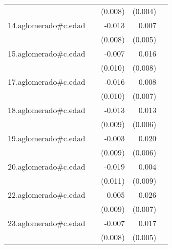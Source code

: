 {\begin{longtable}{l*{4}{D{.}{.}{-1}}}
            &                     &     (0.008)         &     (0.004)         &                     \\
\addlinespace
14.aglomerado#c.edad&                     &      -0.013         &       0.007         &                     \\
            &                     &     (0.008)         &     (0.005)         &                     \\
\addlinespace
15.aglomerado#c.edad&                     &      -0.007         &       0.016\sym{*}  &                     \\
            &                     &     (0.010)         &     (0.008)         &                     \\
\addlinespace
17.aglomerado#c.edad&                     &      -0.016         &       0.008         &                     \\
            &                     &     (0.010)         &     (0.007)         &                     \\
\addlinespace
18.aglomerado#c.edad&                     &      -0.013         &       0.013\sym{*}  &                     \\
            &                     &     (0.009)         &     (0.006)         &                     \\
\addlinespace
19.aglomerado#c.edad&                     &      -0.003         &       0.020\sym{***}&                     \\
            &                     &     (0.009)         &     (0.006)         &                     \\
\addlinespace
20.aglomerado#c.edad&                     &      -0.019         &       0.004         &                     \\
            &                     &     (0.011)         &     (0.009)         &                     \\
\addlinespace
22.aglomerado#c.edad&                     &       0.005         &       0.026\sym{***}&                     \\
            &                     &     (0.009)         &     (0.007)         &                     \\
\addlinespace
23.aglomerado#c.edad&                     &      -0.007         &       0.017\sym{***}&                     \\
            &                     &     (0.008)         &     (0.005)         &                     \\

\end{longtable}}
